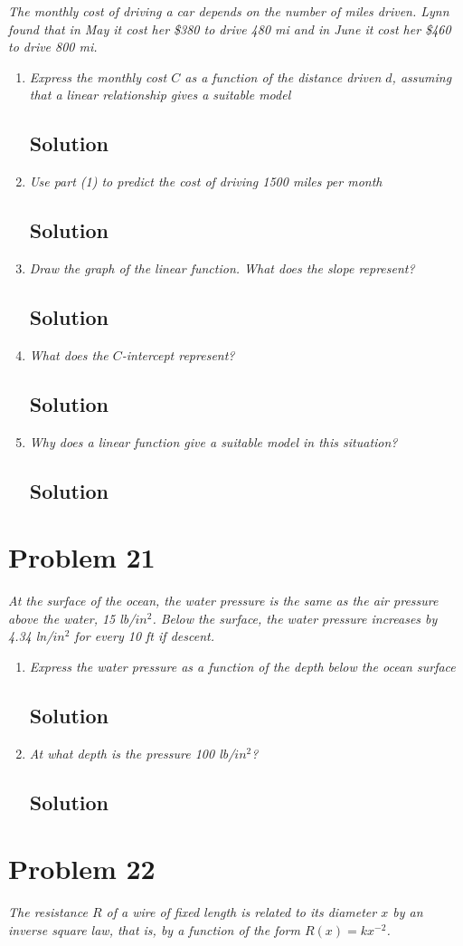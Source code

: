 \documentclass[11pt]{article}
\newcommand{\soln}{\subsection*}
\newcommand{\qn}{\textit}
\begin{document}
\qn{The monthly cost of driving a car depends on the number of miles driven. Lynn found that in May it cost her \$380 to drive 480 mi and in June it cost her \$460 to drive 800 mi.}

\begin{enumerate}
	\item \qn{Express the monthly cost $C$ as a function of the distance driven $d$, assuming that a linear relationship gives a suitable model}
	\soln{Solution}
	
	\item \qn{Use part (1) to predict the cost of driving 1500 miles per month}
	\soln{Solution}
	
	\item \qn{Draw the graph of the linear function. What does the slope represent?}
	\soln{Solution}
	
	\item \qn{What does the $C$-intercept represent?}
	\soln{Solution}
	
	\item \qn{Why does a linear function give a suitable model in this situation?}
	\soln{Solution}
\end{enumerate}

\section*{Problem 21}

\qn{At the surface of the ocean, the water pressure is the same as the air pressure above the water, 15 lb/$in^2$. Below the surface, the water pressure increases by 4.34 ln/$in^2$ for every 10 ft if descent.}

\begin{enumerate}
	\item \qn{Express the water pressure as a function of the depth below the ocean surface}
	\soln{Solution}
	
	\item \qn{At what depth is the pressure 100 lb/$in^2$?}
	\soln{Solution}
\end{enumerate}

\section*{Problem 22}

\qn{The resistance $R$ of a wire of fixed length is related to its diameter $x$ by an inverse square law, that is, by a function of the form $R(x)=kx^{-2}$.}
\end{document}
